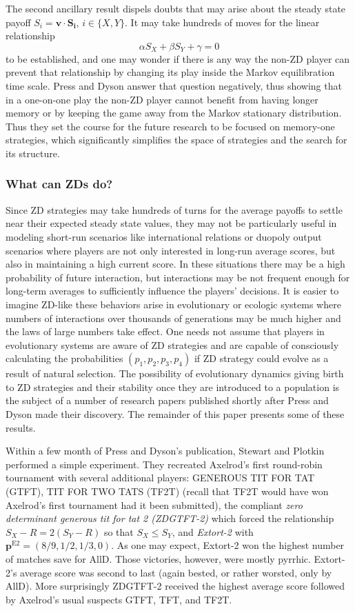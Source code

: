 The second ancillary result dispels doubts that may arise about the steady state payoff $S_i = \mathbf{v}\cdot \mathbf{S_i}$, $i \in \{X, Y\}$. It may take hundreds of moves for the linear relationship
\[
\alpha S_X + \beta S_Y + \gamma = 0
\]
to be established, and one may wonder if there is any way the non-ZD player can prevent that relationship by changing its play inside the Markov equilibration time scale. Press and Dyson answer that question negatively, thus showing that in a one-on-one play the non-ZD player cannot benefit from having longer memory or by keeping the game away from the Markov stationary distribution. Thus they set the course for the future research to be focused on memory-one strategies, which significantly simplifies the space of strategies and the search for its structure.

\subsubsection{What can ZDs do?}

Since ZD strategies may take hundreds of turns for the average payoffs to settle near their expected steady state values, they may not be particularly useful in modeling short-run scenarios like international relations or duopoly output scenarios where players are not only interested in long-run average scores, but also in maintaining a high current score. In these situations there may be a high probability of future interaction, but interactions may be not frequent enough for long-term averages to sufficiently influence the players' decisions. It is easier to imagine ZD-like these behaviors arise in evolutionary or ecologic systems where numbers of interactions over thousands of generations may be much higher and the laws of large numbers take effect. One needs not assume that players in evolutionary systems are aware of ZD strategies and are capable of consciously calculating the probabilities $(p_1, p_2, p_3, p_4)$ if ZD strategy could evolve as a result of natural selection. The possibility of evolutionary dynamics giving birth to ZD strategies and their stability once they are introduced to a population is the subject of a number of research papers published shortly after Press and Dyson made their discovery. The remainder of this paper presents some of these results.

Within a few month of Press and Dyson's publication, Stewart and Plotkin \cite{Stewart26062012} performed a simple experiment. They recreated Axelrod's first round-robin tournament with several additional players: GENEROUS TIT FOR TAT (GTFT), TIT FOR TWO TATS (TF2T) (recall that TF2T would have won Axelrod's first tournament had it been submitted), the compliant \textit{zero determinant generous tit for tat 2 (ZDGTFT-2)} which forced the relationship $S_X - R = 2(S_Y - R)$ so that $S_X \leq S_Y$, and \textit{Extort-2} with $\mathbf{p}^{\textrm{E2}} = (8/9, 1/2, 1/3, 0)$. As one may expect, Extort-2 won the highest number of matches save for AllD. Those victories, however, were mostly pyrrhic. Extort-2's average score was second to last (again bested, or rather worsted, only by AllD). More surprisingly ZDGTFT-2 received the highest average score followed by Axelrod's usual suspects GTFT, TFT, and TF2T. 

